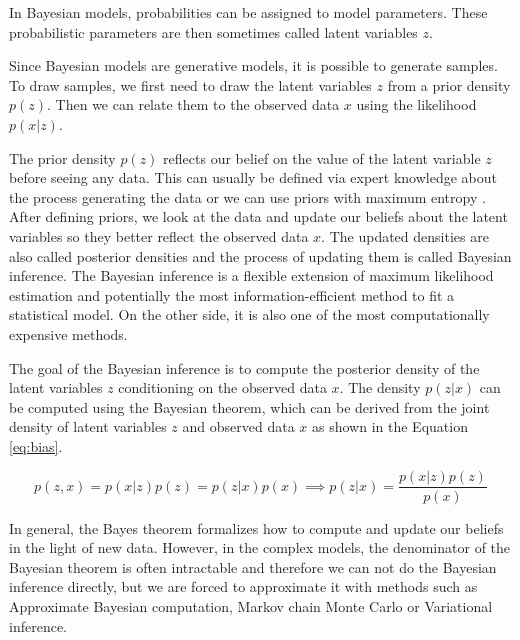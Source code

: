 In Bayesian models, probabilities can be assigned to model parameters.
These probabilistic parameters are then sometimes called latent variables $z$.

Since Bayesian models are generative models, it is possible to generate samples.
To draw samples, we first need to draw the latent variables $z$ from a prior density $p(z)$.
Then we can relate them to the observed data $x$ using the likelihood $p(x|z)$.

The prior density $p(z)$ reflects our belief on the value of the latent variable $z$ before seeing any data.
This can usually be defined via expert knowledge about the process generating the data or we can use priors with maximum entropy \cite{mcelreath2018statistical}. 
After defining priors, we look at the data and update our beliefs about the latent variables so they better reflect the observed data $x$.
The updated densities are also called posterior densities and the process of updating them is called Bayesian inference.
The Bayesian inference is a flexible extension of maximum likelihood estimation and potentially the most information-efficient method to fit a statistical model.
On the other side, it is also one of the most computationally expensive methods.

The goal of the Bayesian inference is to compute the posterior density of the latent variables $z$ conditioning on the observed data $x$.
The density $p(z|x)$ can be computed using the Bayesian theorem, which can be derived from the joint density of latent variables $z$ and observed data $x$ as shown in the Equation \ref{eq:bias}.

\begin{equation}
    p(z, x) = p(x|z)p(z) = p(z|x)p(x) \implies p(z|x) = \frac{p(x|z) p(z)}{p(x)}
    \label{eq:bias}
\end{equation}

In general, the Bayes theorem formalizes how to compute and update our beliefs in the light of new data.
However, in the complex models, the denominator of the Bayesian theorem is often intractable and therefore we can not do the Bayesian inference directly, but we are forced to approximate it with methods such as Approximate Bayesian computation, Markov chain Monte Carlo or Variational inference.

